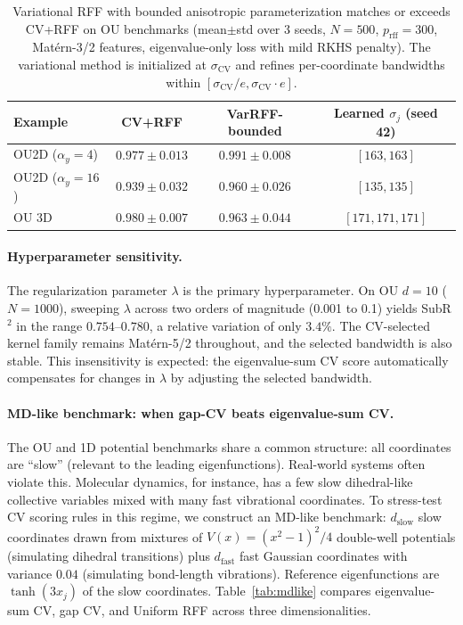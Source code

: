 \documentclass[11pt]{article}
\theoremstyle{remark}
\begin{document}
\begin{table}[t]
\centering
\begin{tabular}{lccc}
\toprule
Example & CV+RFF & \textbf{VarRFF-bounded} & Learned $\sigma_j$ (seed 42) \\
\midrule
OU2D ($\alpha_y\!=\!4$)   & $0.977\pm0.013$ & $\mathbf{0.991\pm0.008}$ & $[163,163]$ \\
OU2D ($\alpha_y\!=\!16$)  & $0.939\pm0.032$ & $\mathbf{0.960\pm0.026}$ & $[135,135]$ \\
OU 3D                      & $\mathbf{0.980\pm0.007}$ & $0.963\pm0.044$ & $[171,171,171]$ \\
\bottomrule
\end{tabular}
\caption{Variational RFF with bounded anisotropic parameterization matches or exceeds CV+RFF on OU benchmarks (mean$\pm$std over 3 seeds, $N\!=\!500$, $p_{\mathrm{rff}}\!=\!300$, Mat\'ern-3/2 features, eigenvalue-only loss with mild RKHS penalty). The variational method is initialized at $\sigma_{\mathrm{CV}}$ and refines per-coordinate bandwidths within $[\sigma_{\mathrm{CV}}/e,\sigma_{\mathrm{CV}}\cdot e]$.}
\label{tab:tier1}
\end{table}

\paragraph{Hyperparameter sensitivity.}
The regularization parameter $\lambda$ is the primary hyperparameter. On OU $d=10$ ($N=1000$), sweeping $\lambda$ across two orders of magnitude (0.001 to 0.1) yields SubR$^2$ in the range $0.754$--$0.780$, a relative variation of only $3.4\%$. The CV-selected kernel family remains Mat\'ern-5/2 throughout, and the selected bandwidth is also stable.
This insensitivity is expected: the eigenvalue-sum CV score automatically compensates for changes in $\lambda$ by adjusting the selected bandwidth.

\paragraph{MD-like benchmark: when gap-CV beats eigenvalue-sum CV.}
The OU and 1D potential benchmarks share a common structure: all coordinates are ``slow'' (relevant to the leading eigenfunctions).
Real-world systems often violate this. Molecular dynamics, for instance, has a few slow dihedral-like collective variables mixed with many fast vibrational coordinates.
To stress-test CV scoring rules in this regime, we construct an MD-like benchmark: $d_\text{slow}$ slow coordinates drawn from mixtures of $V(x)=(x^2-1)^2/4$ double-well potentials (simulating dihedral transitions) plus $d_\text{fast}$ fast Gaussian coordinates with variance $0.04$ (simulating bond-length vibrations).
Reference eigenfunctions are $\tanh(3x_j)$ of the slow coordinates.
Table~\ref{tab:mdlike} compares eigenvalue-sum CV, gap CV, and Uniform RFF across three dimensionalities.
\end{document}
